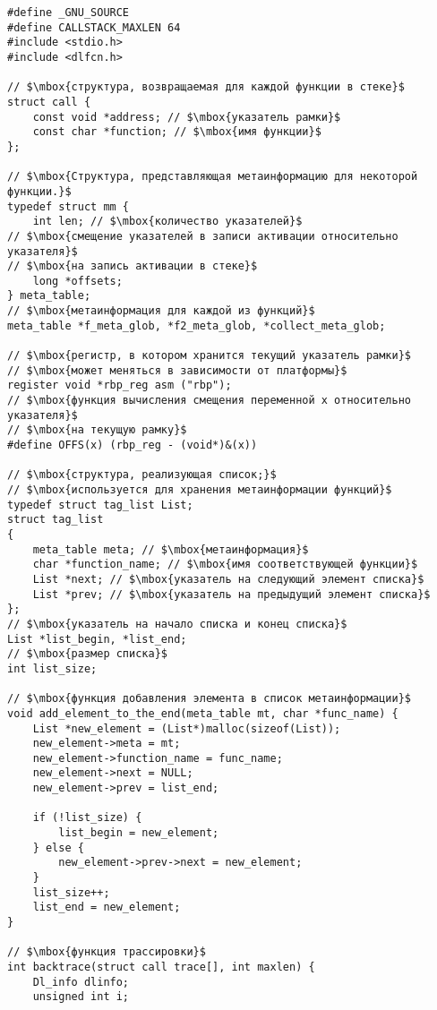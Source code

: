 \begin{lstlisting}[mathescape=true]
#define _GNU_SOURCE
#define CALLSTACK_MAXLEN 64
#include <stdio.h>
#include <dlfcn.h>

// $\mbox{структура, возвращаемая для каждой функции в стеке}$
struct call {
    const void *address; // $\mbox{указатель рамки}$
	const char *function; // $\mbox{имя функции}$
};

// $\mbox{Структура, представляющая метаинформацию для некоторой функции.}$
typedef struct mm {
	int len; // $\mbox{количество указателей}$
// $\mbox{смещение указателей в записи активации относительно указателя}$
// $\mbox{на запись активации в стеке}$
	long *offsets;
} meta_table;
// $\mbox{метаинформация для каждой из функций}$
meta_table *f_meta_glob, *f2_meta_glob, *collect_meta_glob;

// $\mbox{регистр, в котором хранится текущий указатель рамки}$
// $\mbox{может меняться в зависимости от платформы}$
register void *rbp_reg asm ("rbp");
// $\mbox{функция вычисления смещения переменной x относительно указателя}$
// $\mbox{на текущую рамку}$
#define OFFS(x) (rbp_reg - (void*)&(x))

// $\mbox{структура, реализующая список;}$
// $\mbox{используется для хранения метаинформации функций}$
typedef struct tag_list List;
struct tag_list
{
	meta_table meta; // $\mbox{метаинформация}$
	char *function_name; // $\mbox{имя соответствующей функции}$
	List *next; // $\mbox{указатель на следующий элемент списка}$
	List *prev; // $\mbox{указатель на предыдущий элемент списка}$
};
// $\mbox{указатель на начало списка и конец списка}$
List *list_begin, *list_end;
// $\mbox{размер списка}$
int list_size;

// $\mbox{функция добавления элемента в список метаинформации}$
void add_element_to_the_end(meta_table mt, char *func_name) {
	List *new_element = (List*)malloc(sizeof(List));
	new_element->meta = mt;
	new_element->function_name = func_name;
	new_element->next = NULL;
	new_element->prev = list_end;
	
	if (!list_size)	{
		list_begin = new_element;
	} else {
		new_element->prev->next = new_element;
	}
	list_size++;
	list_end = new_element;
}

// $\mbox{функция трассировки}$
int backtrace(struct call trace[], int maxlen) {
	Dl_info dlinfo;
	unsigned int i;


\end{lstlisting}

